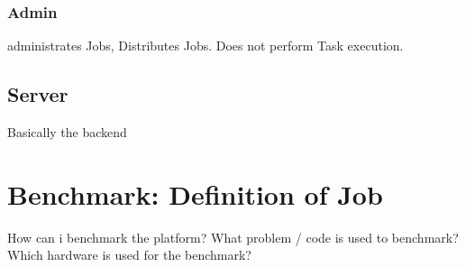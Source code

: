 \subsubsection{Admin}
\label{ssubsec:methodology:entities:client:admin}
administrates Jobs, Distributes Jobs. Does not perform Task execution.
\subsection{Server}
\label{subsec:methodology:entities:task}
Basically the backend

\section{Benchmark: Definition of Job}
\label{sec:methodology:benchmark}
How can i benchmark the platform? What problem / code is used to benchmark? Which hardware is used for the benchmark?